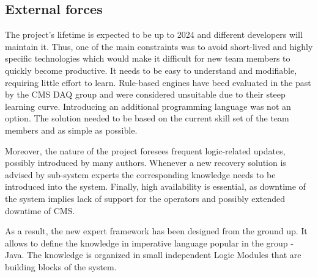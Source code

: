\documentclass[a4paper]{jpconf}
\begin{document}
\subsection{External forces}
The project's lifetime is expected to be up to 2024 and different developers will maintain it. Thus, one of the main constraints was to avoid short-lived and highly specific technologies which would make it difficult for new team members to quickly become productive. It needs to be easy to understand and modifiable, requiring little effort to learn. Rule-based engines have beed evaluated in the past by the CMS DAQ group and were considered unsuitable due to their steep learning curve. Introducing an additional programming language was not an option. The solution needed to be based on the current skill set of the team members and as simple as possible.

Moreover, the nature of the project foresees frequent logic-related updates, possibly introduced by many authors. Whenever a new recovery solution is advised by sub-system experts the corresponding knowledge needs to be introduced into the system. Finally, high availability is essential, as downtime of the system implies lack of support for the operators and possibly extended downtime of CMS. 

As a result, the new expert framework has been designed from the ground up. It allows to define the knowledge in imperative language popular in the group - Java. The knowledge is organized in small independent Logic Modules that are building blocks of the system.
\end{document}
